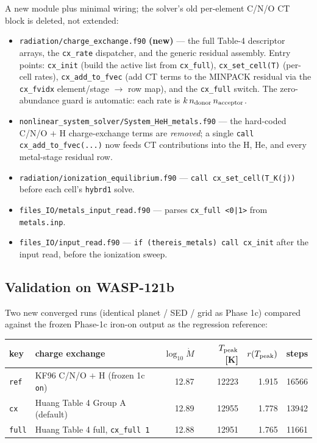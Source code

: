 \documentclass[english,a4paper]{kiseon_memo}
\begin{document}
A new module plus minimal wiring; the solver's old per-element C/N/O CT block is
deleted, not extended:
\begin{itemize}
\item \texttt{radiation/charge\_exchange.f90} \textbf{(new)} --- the full Table-4
  descriptor arrays, the \verb|cx_rate| dispatcher, and the generic residual
  assembly. Entry points: \verb|cx_init| (build the active list from
  \verb|cx_full|), \verb|cx_set_cell(T)| (per-cell rates), \verb|cx_add_to_fvec|
  (add CT terms to the MINPACK residual via the \verb|cx_fvidx| element/stage
  $\to$ row map), and the \verb|cx_full| switch. The zero-abundance guard is
  automatic: each rate is $k\,n_{\rm donor}\,n_{\rm acceptor}$.
\item \texttt{nonlinear\_system\_solver/System\_HeH\_metals.f90} --- the
  hard-coded C/N/O $+$ H charge-exchange terms are \emph{removed}; a single
  \verb|call cx_add_to_fvec(...)| now feeds CT contributions into the H, He, and
  every metal-stage residual row.
\item \texttt{radiation/ionization\_equilibrium.f90} ---
  \verb|call cx_set_cell(T_K(j))| before each cell's \verb|hybrd1| solve.
\item \texttt{files\_IO/metals\_input\_read.f90} --- parses
  \verb!cx_full <0|1>! from \texttt{metals.inp}.
\item \texttt{files\_IO/input\_read.f90} ---
  \verb|if (thereis_metals) call cx_init| after the input read, before the
  ionization sweep.
\end{itemize}

\subsection{Validation on WASP-121b}

Two new converged runs (identical planet / SED / grid as Phase 1c) compared
against the frozen Phase-1c iron-on output as the regression reference:

\begin{center}
\begin{tabular}{llrrrr}
\hline
key & charge exchange & $\log_{10}\dot M$ & $T_{\rm peak}$ [K] & $r(T_{\rm peak})$ & steps \\
\hline
\texttt{ref}  & KF96 C/N/O $+$ H (frozen 1c \texttt{on}) & 12.87 & 12223 & 1.915 & 16566 \\
\texttt{cx}   & Huang Table 4 Group A (default)         & 12.89 & 12955 & 1.778 & 13942 \\
\texttt{full} & Huang Table 4 full, \verb|cx_full 1|    & 12.88 & 12951 & 1.765 & 11661 \\
\hline
\end{tabular}
\end{center}
\end{document}
